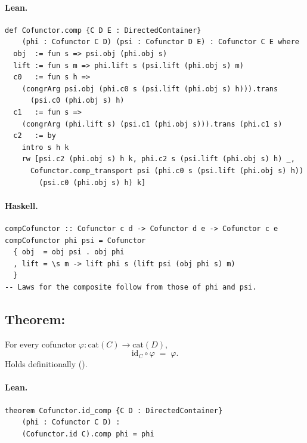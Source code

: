 \documentclass[11pt,a4paper]{article}
\begin{document}
\paragraph{Lean.}
\begin{lstlisting}[style=lean]
def Cofunctor.comp {C D E : DirectedContainer}
    (phi : Cofunctor C D) (psi : Cofunctor D E) : Cofunctor C E where
  obj  := fun s => psi.obj (phi.obj s)
  lift := fun s m => phi.lift s (psi.lift (phi.obj s) m)
  c0   := fun s h =>
    (congrArg psi.obj (phi.c0 s (psi.lift (phi.obj s) h))).trans
      (psi.c0 (phi.obj s) h)
  c1   := fun s =>
    (congrArg (phi.lift s) (psi.c1 (phi.obj s))).trans (phi.c1 s)
  c2   := by
    intro s h k
    rw [psi.c2 (phi.obj s) h k, phi.c2 s (psi.lift (phi.obj s) h) _,
      Cofunctor.comp_transport psi (phi.c0 s (psi.lift (phi.obj s) h))
        (psi.c0 (phi.obj s) h) k]
\end{lstlisting}

\paragraph{Haskell.}
\begin{lstlisting}[style=haskell]
compCofunctor :: Cofunctor c d -> Cofunctor d e -> Cofunctor c e
compCofunctor phi psi = Cofunctor
  { obj  = obj psi . obj phi
  , lift = \s m -> lift phi s (lift psi (obj phi s) m)
  }
-- Laws for the composite follow from those of phi and psi.
\end{lstlisting}


\subsection{Theorem: }

\begin{thm}
For every cofunctor $\varphi : \mathrm{cat}(C) \to \mathrm{cat}(D)$,
\[
  \mathrm{id}_C \circ \varphi \;=\; \varphi.
\]
Holds definitionally ().
\end{thm}

\paragraph{Lean.}
\begin{lstlisting}[style=lean]
theorem Cofunctor.id_comp {C D : DirectedContainer}
    (phi : Cofunctor C D) :
    (Cofunctor.id C).comp phi = phi
\end{lstlisting}
\end{document}
